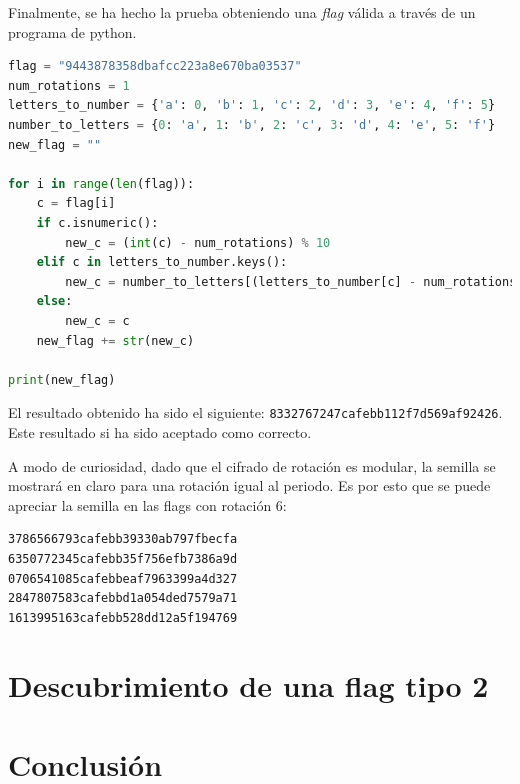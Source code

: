 \documentclass[]{article}
\begin{document}
Finalmente, se ha hecho la prueba obteniendo una \textit{flag} válida a través
de un programa de python.

\lstset{style=python}
\begin{lstlisting}[language=Python, caption=Decodificación de una flag de rotación 1]
flag = "9443878358dbafcc223a8e670ba03537"
num_rotations = 1
letters_to_number = {'a': 0, 'b': 1, 'c': 2, 'd': 3, 'e': 4, 'f': 5}
number_to_letters = {0: 'a', 1: 'b', 2: 'c', 3: 'd', 4: 'e', 5: 'f'}
new_flag = ""

for i in range(len(flag)):
    c = flag[i]
    if c.isnumeric():
        new_c = (int(c) - num_rotations) % 10
    elif c in letters_to_number.keys():
        new_c = number_to_letters[(letters_to_number[c] - num_rotations) % 6]
    else:
        new_c = c
    new_flag += str(new_c)

print(new_flag)

\end{lstlisting}

El resultado obtenido ha sido el siguiente:
\texttt{8332767247cafebb112f7d569af92426}. Este resultado si ha sido aceptado
como correcto.

A modo de curiosidad, dado que el cifrado de rotación es modular, la semilla se
mostrará en claro para una rotación igual al periodo. Es por esto que se puede
apreciar la semilla en las flags con rotación 6:

\begin{lstlisting}[language=flag, caption=Flags para rotacion 6]
3786566793cafebb39330ab797fbecfa
6350772345cafebb35f756efb7386a9d
0706541085cafebbeaf7963399a4d327
2847807583cafebbd1a054ded7579a71
1613995163cafebb528dd12a5f194769
\end{lstlisting}

\section{Descubrimiento de una flag tipo 2}
\label{sec:tipo2}

\section{Conclusión}
\label{sec:conclusion}
\end{document}
